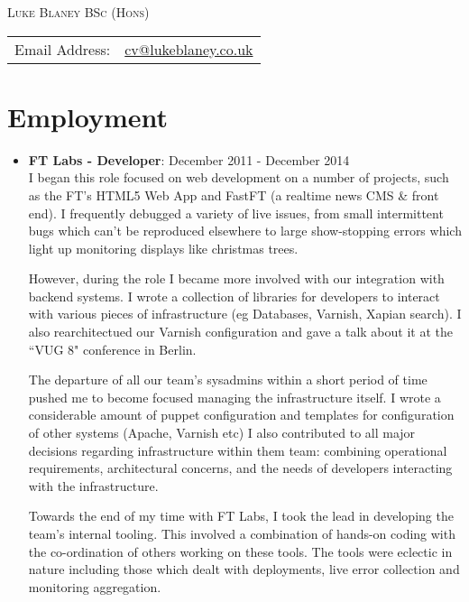 \documentclass[a4paper]{article}
\begin{document}
\begin{center}\textsc{\LARGE Luke Blaney BSc (Hons)}\end{center}

\begin{tabular}{ l l }

Email Address: & \href{mailto:cv@lukeblaney.co.uk}{cv@lukeblaney.co.uk}\\

\end{tabular}

\section*{Employment}


\begin{itemize}

\item {\bf FT Labs - Developer}: December 2011 - December 2014\\
I began this role focused on web development on a number of projects, such as the FT's HTML5 Web App and FastFT (a realtime news CMS \& front end). I frequently debugged a variety of live issues, from small intermittent bugs which can't be reproduced elsewhere to large show-stopping errors which light up monitoring displays like christmas trees.\par

However, during the role I became more involved with our integration with backend systems. I wrote a collection of libraries for developers to interact with various pieces of infrastructure (eg Databases, Varnish, Xapian search). I also rearchitectued our Varnish configuration and gave a talk about it at the ``VUG 8" conference in Berlin.\par

The departure of all our team's sysadmins within a short period of time pushed me to become focused managing the infrastructure itself.  I wrote a considerable amount of puppet configuration and  templates for configuration of other systems (Apache, Varnish etc) I also contributed to all major decisions regarding infrastructure within them team: combining operational requirements, architectural concerns, and the needs of developers interacting with the infrastructure.\par

Towards the end of my time with FT Labs, I took the lead in developing the team's internal tooling.  This involved a combination of hands-on coding with the co-ordination of others working on these tools.  The tools were eclectic in nature including those which dealt with deployments, live error collection and monitoring aggregation.


\end{itemize}
\end{document}
